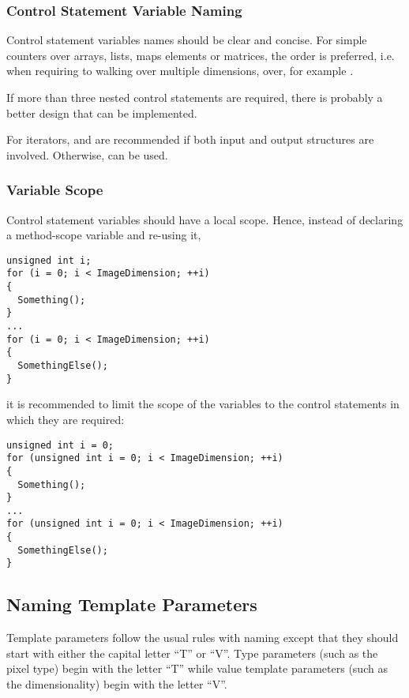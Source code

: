 \subsubsection{Control Statement Variable Naming}
\label{subsubsec:ControlStatementVariableNaming}

Control statement variables names should be clear and concise. For simple
counters over arrays, lists, maps elements or matrices, the 
order is preferred, i.e. when requiring to walking over multiple dimensions,
over, for example .

If more than three nested control statements are required, there is probably
a better design that can be implemented.

For iterators,  and  are recommended if both input and
output structures are involved. Otherwise,  can be used.


\subsubsection{Variable Scope}
\label{subsubsec:VariableScope}

Control statement variables should have a local scope. Hence, instead of
declaring a method-scope variable and re-using it,
\small
\begin{verbatim}
unsigned int i;
for (i = 0; i < ImageDimension; ++i)
{
  Something();
}
...
for (i = 0; i < ImageDimension; ++i)
{
  SomethingElse();
}
\end{verbatim}
\normalsize

it is recommended to limit the scope of the variables to the control
statements in which they are required:

\small
\begin{verbatim}
unsigned int i = 0;
for (unsigned int i = 0; i < ImageDimension; ++i)
{
  Something();
}
...
for (unsigned int i = 0; i < ImageDimension; ++i)
{
  SomethingElse();
}
\end{verbatim}
\normalsize


\subsection{Naming Template Parameters}
\label{subsec:NamingTemplateParameters}

Template parameters follow the usual rules with naming except that they should
start with either the capital letter ``T'' or ``V''. Type parameters (such as
the pixel type) begin with the letter ``T'' while value template parameters
(such as the dimensionality) begin with the letter ``V''.

